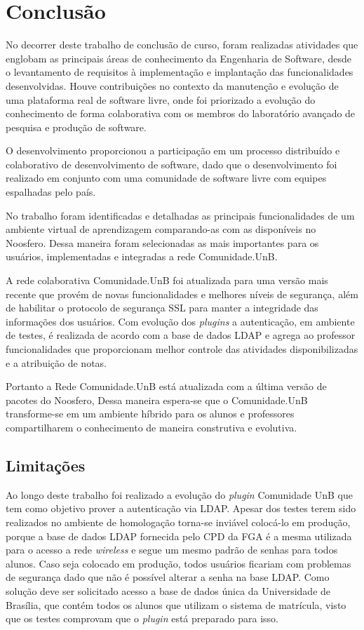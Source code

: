 \chapter{Conclusão}
\label{conclusao}

No decorrer deste trabalho de conclusão de curso, foram realizadas atividades que englobam as principais áreas de conhecimento da Engenharia de Software, desde o levantamento de requisitos à implementação e implantação das funcionalidades desenvolvidas. Houve contribuições no contexto da manutenção e evolução de uma plataforma real de software livre, onde foi priorizado a evolução do conhecimento de forma colaborativa com os membros do laboratório avançado de pesquisa e produção de software.

O desenvolvimento proporcionou a participação em um processo distribuído e colaborativo de desenvolvimento de software, dado que o desenvolvimento foi realizado em conjunto com uma comunidade de software livre com equipes espalhadas pelo país.

No trabalho foram identificadas e detalhadas as principais funcionalidades de um ambiente virtual de aprendizagem comparando-as com as disponíveis no Noosfero. Dessa maneira foram selecionadas as mais importantes para os usuários, implementadas e integradas a rede Comunidade.UnB. 

A rede colaborativa Comunidade.UnB foi atualizada para uma versão mais recente que provém de novas funcionalidades e melhores níveis de segurança, além de habilitar o protocolo de segurança SSL para manter a integridade das informações dos usuários. Com evolução dos \textit{plugins} a autenticação, em ambiente de testes, é realizada de acordo com a base de dados LDAP e agrega ao professor funcionalidades que proporcionam melhor controle das atividades disponibilizadas e a atribuição de notas.

Portanto a Rede Comunidade.UnB está atualizada com a última versão de pacotes do Noosfero, 
Dessa maneira espera-se que o Comunidade.UnB transforme-se em um ambiente híbrido para os alunos e professores compartilharem o conhecimento de maneira construtiva e evolutiva.

\section{Limitações}

Ao longo deste trabalho foi realizado a evolução do \textit{plugin} Comunidade UnB que tem como objetivo prover a autenticação via LDAP. Apesar dos testes terem sido realizados no ambiente de homologação torna-se inviável colocá-lo em produção, porque a base de dados LDAP fornecida pelo CPD da FGA é a mesma utilizada para o acesso a rede \textit{wireless} e segue um mesmo padrão de senhas para todos alunos. Caso seja colocado em produção, todos usuários ficariam com problemas de segurança dado que não é possível alterar a senha na base LDAP. Como solução deve ser solicitado acesso a base de dados única da Universidade de Brasília, que contém todos os alunos que utilizam o sistema de matrícula, visto que os testes comprovam que o \textit{plugin} está preparado para isso.

